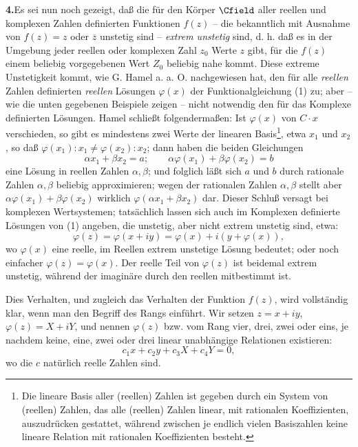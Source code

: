 \documentclass[11pt]{article}
\begin{document}
\medskip
\noindent\textbf{4.}\quad Es sei nun noch gezeigt, daß die für den Körper \(\Cfield\) aller reellen und komplexen Zahlen definierten Funktionen \(f(z)\) -- die bekanntlich mit Ausnahme von \(f(z)=z\) oder \(\overline z\) unstetig sind -- \emph{extrem unstetig} sind, d. h. daß es in der Umgebung jeder reellen oder komplexen Zahl \(z_0\) Werte \(z\) gibt, für die \(f(z)\) einem beliebig vorgegebenen Wert \(Z_0\) beliebig nahe kommt. Diese extreme Unstetigkeit kommt, wie G. Hamel a. a. O. nachgewiesen hat, den für alle \emph{reellen} Zahlen definierten \emph{reellen} Lösungen \(\varphi(x)\) der Funktionalgleichung (1) zu; aber -- wie die unten gegebenen Beispiele zeigen -- nicht notwendig den für das Komplexe definierten Lösungen. Hamel schließt folgendermaßen: Ist \(\varphi(x)\) von \(C\cdot x\) verschieden, so gibt es mindestens zwei Werte der linearen Basis\footnote{Die lineare Basis aller (reellen) Zahlen ist gegeben durch ein System von (reellen) Zahlen, das alle (reellen) Zahlen linear, mit rationalen Koeffizienten, auszudrücken gestattet, während zwischen je endlich vielen Basiszahlen keine lineare Relation mit rationalen Koeffizienten besteht.}, etwa \(x_1\) und \(x_2\), so daß \(\varphi(x_1):x_1\ne\varphi(x_2):x_2\); dann haben die beiden Gleichungen
\[
\alpha x_1+\beta x_2=a;\qquad \alpha\varphi(x_1)+\beta\varphi(x_2)=b
\]
eine Lösung in reellen Zahlen \(\alpha,\beta\); und folglich läßt sich \(a\) und \(b\) durch rationale Zahlen \(\alpha,\beta\) beliebig approximieren; wegen der rationalen Zahlen \(\alpha,\beta\) stellt aber \(\alpha\varphi(x_1)+\beta\varphi(x_2)\) wirklich \(\varphi(\alpha x_1+\beta x_2)\) dar. Dieser Schluß versagt bei komplexen Wertsystemen; tatsächlich lassen sich auch im Komplexen definierte Lösungen von (1) angeben, die unstetig, aber nicht extrem unstetig sind, etwa:
\[
\varphi(z)=\varphi(x+iy)=\varphi(x)+i(y+\varphi(x)),
\]
wo \(\varphi(x)\) eine reelle, im Reellen extrem unstetige Lösung bedeutet; oder noch einfacher \(\varphi(z)=\varphi(x)\). Der reelle Teil von \(\varphi(z)\) ist beidemal extrem unstetig, während der imaginäre durch den reellen mitbestimmt ist.

Dies Verhalten, und zugleich das Verhalten der Funktion \(f(z)\), wird vollständig klar, wenn man den Begriff des Rangs einführt. Wir setzen \(z=x+iy\), \(\varphi(z)=X+iY\), und nennen \(\varphi(z)\) bzw. vom Rang vier, drei, zwei oder eins, je nachdem keine, eine, zwei oder drei linear unabhängige Relationen existieren:
\[
c_1x+c_2y+c_3X+c_4Y=0,
\]
wo die \(c\) natürlich reelle Zahlen sind.
\end{document}
